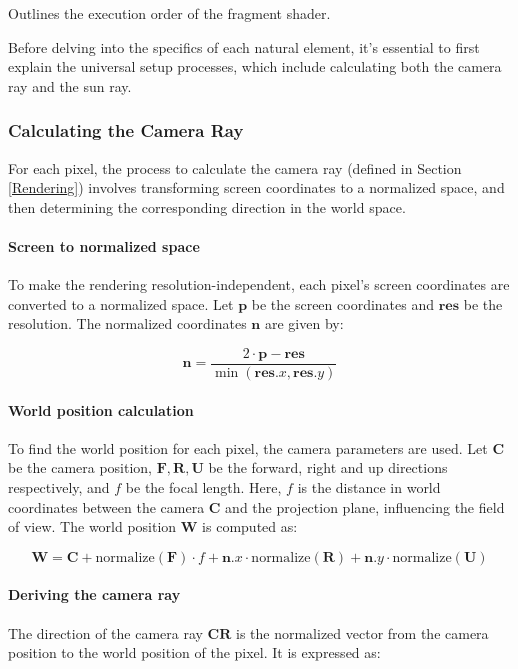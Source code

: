 {Outlines the execution order of the fragment shader.}

Before delving into the specifics of each natural element, it’s essential to first explain the universal setup processes, which include calculating both the camera ray and the sun ray.

\subsubsection{Calculating the Camera Ray}

For each pixel, the process to calculate the camera ray (defined in Section \ref{Rendering}) involves transforming screen coordinates to a normalized space, and then determining the corresponding direction in the world space.

\paragraph{Screen to normalized space}
To make the rendering resolution-independent, each pixel's screen coordinates are converted to a normalized space. Let $\mathbf{p}$ be the screen coordinates and $\mathbf{res}$ be the resolution. The normalized coordinates $\mathbf{n}$ are given by:

\begin{equation}
   \mathbf{n} = \frac{2 \cdot \mathbf{p} - \mathbf{res}}{\min(\mathbf{res}.x, \mathbf{res}.y)}
\end{equation}

\paragraph{World position calculation}
To find the world position for each pixel, the camera parameters are used. Let $\mathbf{C}$ be the camera position, $\mathbf{F}, \mathbf{R}, \mathbf{U}$ be the forward, right and up directions respectively, and $f$ be the focal length. Here, $f$ is the distance in world coordinates between the camera $\mathbf{C}$ and the projection plane, influencing the field of view. The world position $\mathbf{W}$ is computed as:

\begin{equation}
   \mathbf{W} = \mathbf{C} + \text{normalize}(\mathbf{F}) \cdot f + \mathbf{n}.x \cdot \text{normalize}(\mathbf{R}) + \mathbf{n}.y \cdot \text{normalize}(\mathbf{U})
\end{equation}

\paragraph{Deriving the camera ray}
The direction of the camera ray $\mathbf{CR}$ is the normalized vector from the camera position to the world position of the pixel. It is expressed as:

